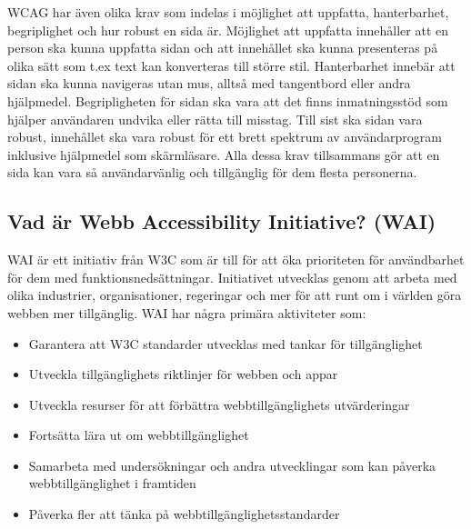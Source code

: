 \documentclass[11p]{article}
\begin{document}
WCAG har även olika krav som indelas i möjlighet att uppfatta, hanterbarhet, begriplighet och hur robust en sida är.
Möjlighet att uppfatta innehåller att en person ska kunna uppfatta sidan och att innehållet ska kunna presenteras på olika sätt som t.ex text kan konverteras till större stil.
Hanterbarhet innebär att sidan ska kunna navigeras utan mus, alltså med tangentbord eller andra hjälpmedel.
Begripligheten för sidan ska vara att det finns inmatningsstöd som hjälper användaren undvika eller rätta till misstag.
Till sist ska sidan vara robust, innehållet ska vara robust för ett brett spektrum av användarprogram inklusive hjälpmedel som skärmläsare.
Alla dessa krav tillsammans gör att en sida kan vara så användarvänlig och tillgänglig för dem flesta personerna. \textcite{Digg_2023}

\subsection{Vad är Webb Accessibility Initiative? (WAI)}
WAI är ett initiativ från W3C som är till för att öka prioriteten för användbarhet för dem med funktionsnedsättningar.
Initiativet utvecklas genom att arbeta med olika industrier, organisationer, regeringar och mer för att runt om i världen göra webben mer tillgänglig.
WAI har några primära aktiviteter som:

\begin{itemize}
    \item Garantera att W3C standarder utvecklas med tankar för tillgänglighet
    \item Utveckla tillgänglighets riktlinjer för webben och appar
    \item Utveckla resurser för att förbättra webbtillgänglighets utvärderingar
    \item Fortsätta lära ut om webbtillgänglighet
    \item Samarbeta med undersökningar och andra utvecklingar som kan påverka webbtillgänglighet i framtiden
    \item Påverka fler att tänka på webbtillgänglighetsstandarder
\end{itemize}

\textcite{WAI}



\printbibliography
\end{document}
